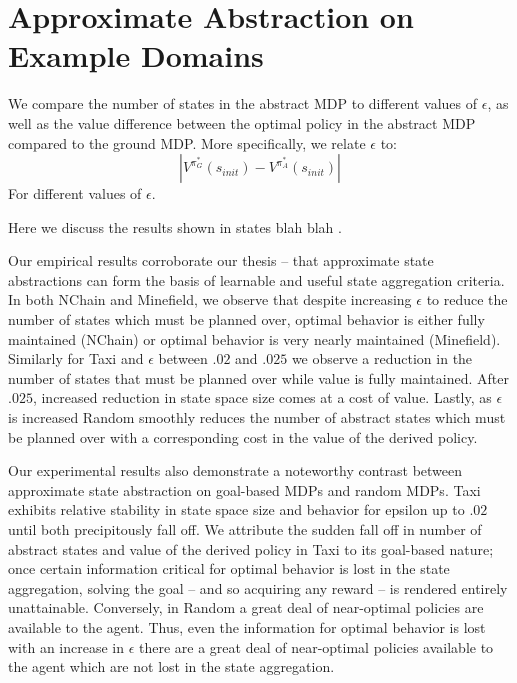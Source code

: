 \section{Approximate Abstraction on Example Domains}

We compare the number of states in the abstract MDP to different values of $\epsilon$, as well as the value difference between the optimal policy in the abstract MDP compared to the ground MDP. More specifically, we relate $\epsilon$ to:
\begin{equation}
|V^{\pi_G^*}(s_{init}) - V^{\pi_A^*}(s_{init})|
\end{equation}
For different values of $\epsilon$.

Here we discuss the results shown in states blah blah .

Our empirical results corroborate our thesis -- that approximate state abstractions can form the basis of learnable and useful state aggregation criteria. In both NChain and Minefield, we observe that despite increasing $\epsilon$ to reduce the number of states which must be planned over, optimal behavior is either fully maintained (NChain) or optimal behavior is very nearly maintained (Minefield). Similarly for Taxi and $\epsilon$ between $.02$ and $.025$ we observe a reduction in the number of states that must be planned over while value is fully maintained. After $.025$, increased reduction in state space size comes at a cost of value. Lastly, as $\epsilon$ is increased Random smoothly reduces the number of abstract states which must be planned over with a corresponding cost in the value of the derived policy.

Our experimental results also demonstrate a noteworthy contrast between approximate state abstraction on goal-based \acp{MDP} and random \acp{MDP}. Taxi exhibits relative stability in state space size and behavior for epsilon up to $.02$ until both precipitously fall off. We attribute the sudden fall off in number of abstract states and value of the derived policy in Taxi to its goal-based nature; once certain information critical for optimal behavior is lost in the state aggregation, solving the goal -- and so acquiring any reward -- is rendered entirely unattainable. Conversely, in Random a great deal of near-optimal policies are available to the agent. Thus, even the information for optimal behavior is lost with an increase in $\epsilon$ there are a great deal of near-optimal policies available to the agent which are not lost in the state aggregation.

